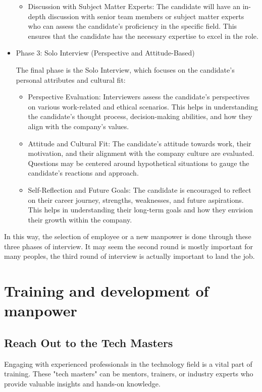 \begin{itemize}
\begin{itemize}
    \item Discussion with Subject Matter Experts:
        The candidate will have an in-depth discussion with senior team members or subject matter experts who can assess the candidate's proficiency in the specific field. This ensures that the candidate has the necessary expertise to excel in the role.
    \end{itemize} 
\item Phase 3: Solo Interview (Perspective and Attitude-Based)

The final phase is the Solo Interview, which focuses on the candidate's personal attributes and cultural fit:
    \begin{itemize}
    \item Perspective Evaluation:
        Interviewers assess the candidate’s perspectives on various work-related and ethical scenarios. This helps in understanding the candidate's thought process, decision-making abilities, and how they align with the company's values.

    \item Attitude and Cultural Fit:
        The candidate's attitude towards work, their motivation, and their alignment with the company culture are evaluated. Questions may be centered around hypothetical situations to gauge the candidate's reactions and approach.

    \item Self-Reflection and Future Goals:
        The candidate is encouraged to reflect on their career journey, strengths, weaknesses, and future aspirations. This helps in understanding their long-term goals and how they envision their growth within the company.
    \end{itemize}     
\end{itemize}

In this way, the selection of employee or a new manpower is done through these three phases of interview. It may seem the second round is mostly important for many peoples, the third round of interview is actually important to land the job.
\section{Training and development of manpower}
\subsection{Reach Out to the Tech Masters}


Engaging with experienced professionals in the technology field is a vital part of training. These "tech masters" can be mentors, trainers, or industry experts who provide valuable insights and hands-on knowledge.

